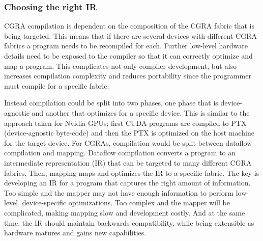 \subsubsection{Choosing the right IR}
CGRA compilation is dependent on the composition of the CGRA fabric that is being targeted.
% 
This means that if there are several devices with different CGRA fabrics a program needs to be recompiled for each.
% 
Further low-level hardware details need to be exposed to the compiler so that it can correctly optimize and map a program.
% 
This complicates not only compiler development, but also increases compilation complexity and reduces portability since the programmer must compile for a specific fabric.


Instead compilation could be split into two phases, one phase that is device-agnostic and another that optimizes for a specific device.
% 
This is similar to the approach taken for Nvidia GPUs; first CUDA programs are compiled to PTX~\cite{ptx} (device-agnostic byte-code) and then the PTX is optimized on the host machine for the target device.
% 
For CGRAs, compilation would be split between dataflow compilation and mapping.
% 
Dataflow compilation converts a program to an intermediate representation (IR) that can be targeted to many different CGRA fabrics.
% 
Then, mapping maps and optimizes the IR to a specific fabric.
% 
The key is developing an IR for a program that captures the right amount of information.
% 
Too simple and the mapper may not have enough information to perform low-level, device-specific optimizations.
% 
Too complex and the mapper will be complicated, making mapping slow and development costly.
%
And at the same time, the IR should maintain backwards compatibility, while being extensible as hardware matures and gains new capabilities.
% 


